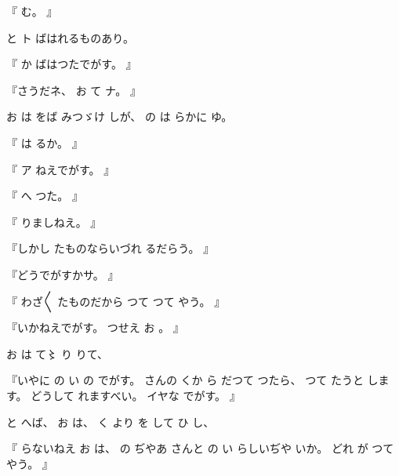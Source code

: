 『
む。
』

と
ト
ばはれるものあり。

『
か
ばはつたでがす。
』

『さうだネ、
%
お
て
ナ。
』

お
は
をば
みつゞけ
しが、
%
の
は
らかに
ゆ。

『
は
るか。
』

『
ア
ねえでがす。
』

『
へ
つた。
』

『
りましねえ。
』

『しかし
たものならいづれ
るだらう。
』

『どうでがすかサ。
』

『
わざ〳〵
たものだから
つて
つて
やう。
』

『いかねえでがす。
%
つせえ
お
。
』

お
は
て〻
り
りて、

『いやに
の
い
の
でがす。
%
さんの
くか
ら
だつて
つたら、
%
つて
たうと
します。
%
どうして
れますべい。
%
イヤな
でがす。
』

と
へば、
%
お
は、
%
く
より
を
して
ひ
し、

『
らないねえ
お
は、
%
の
ぢやあ
さんと
の
い
らしいぢや
いか。
%
どれ
が
つて
やう。
』

